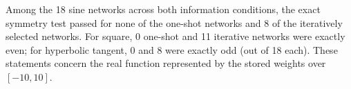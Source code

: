 Among the 18 sine networks across both information conditions, the exact symmetry test passed for none of the one-shot networks and 8 of the iteratively selected networks. For square, 0 one-shot and 11 iterative networks were exactly even; for hyperbolic tangent, 0 and 8 were exactly odd (out of 18 each). These statements concern the real function represented by the stored weights over $[-10,10]$.
